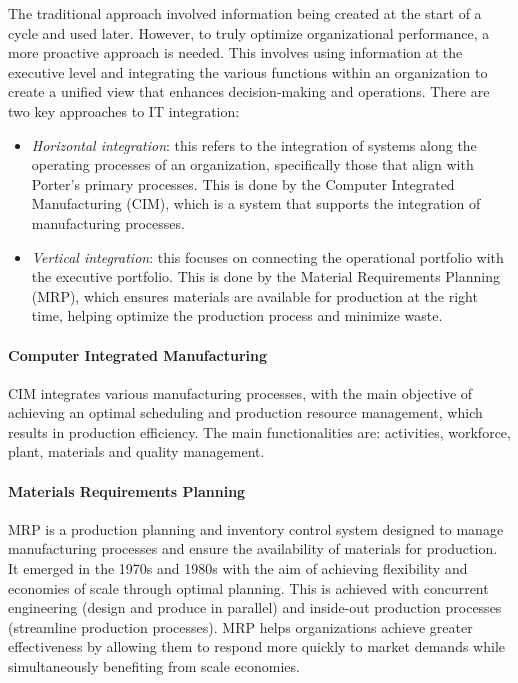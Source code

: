 The traditional approach involved information being created at the start of a cycle and used later. 
However, to truly optimize organizational performance, a more proactive approach is needed. 
This involves using information at the executive level and integrating the various functions within an organization to create a unified view that enhances decision-making and operations.
There are two key approaches to IT integration:
\begin{itemize}
    \item \textit{Horizontal integration}: this refers to the integration of systems along the operating processes of an organization, specifically those that align with Porter's primary processes.
        This is done by the Computer Integrated Manufacturing (CIM), which is a system that supports the integration of manufacturing processes. 
    \item \textit{Vertical integration}: this focuses on connecting the operational portfolio with the executive portfolio. 
        This is done by the Material Requirements Planning (MRP), which ensures materials are available for production at the right time, helping optimize the production process and minimize waste.
\end{itemize}

\paragraph*{Computer Integrated Manufacturing}
CIM integrates various manufacturing processes, with the main objective of achieving an optimal scheduling and production resource management, which results in production efficiency. 
The main functionalities are: activities, workforce, plant, materials and quality management. 

\paragraph*{Materials Requirements Planning}
MRP is a production planning and inventory control system designed to manage manufacturing processes and ensure the availability of materials for production.
It emerged in the 1970s and 1980s with the aim of achieving flexibility and economies of scale through optimal planning. 
This is achieved with concurrent engineering (design and produce in parallel) and inside-out production processes (streamline production processes). 
MRP helps organizations achieve greater effectiveness by allowing them to respond more quickly to market demands while simultaneously benefiting from scale economies. 